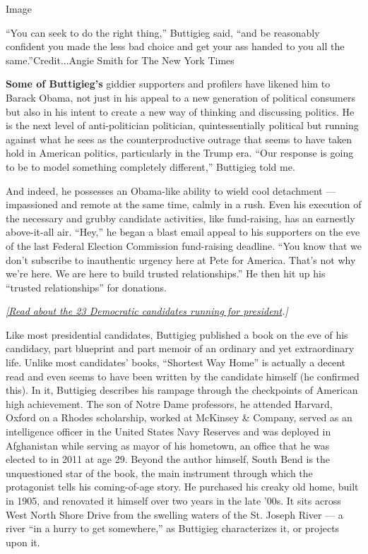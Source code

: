 Image

``You can seek to do the right thing,'' Buttigieg said, ``and be
reasonably confident you made the less bad choice and get your ass
handed to you all the same.''Credit...Angie Smith for The New York Times

\textbf{Some of Buttigieg's} giddier supporters and profilers have
likened him to Barack Obama, not just in his appeal to a new generation
of political consumers but also in his intent to create a new way of
thinking and discussing politics. He is the next level of
anti-politician politician, quintessentially political but running
against what he sees as the counterproductive outrage that seems to have
taken hold in American politics, particularly in the Trump era. ``Our
response is going to be to model something completely different,''
Buttigieg told me.

And indeed, he possesses an Obama-like ability to wield cool detachment
--- impassioned and remote at the same time, calmly in a rush. Even his
execution of the necessary and grubby candidate activities, like
fund-raising, has an earnestly above-it-all air. ``Hey,'' he began a
blast email appeal to his supporters on the eve of the last Federal
Election Commission fund-raising deadline. ``You know that we don't
subscribe to inauthentic urgency here at Pete for America. That's not
why we're here. We are here to build trusted relationships.'' He then
hit up his ``trusted relationships'' for donations.

\href{https://www.nytimes3xbfgragh.onion/2019/06/12/magazine/democratic-primary-candidates-iowa-caucus.html}{\emph{{[}Read
about the 23 Democratic candidates running for president}}\emph{.{]}}

Like most presidential candidates, Buttigieg published a book on the eve
of his candidacy, part blueprint and part memoir of an ordinary and yet
extraordinary life. Unlike most candidates' books, ``Shortest Way Home''
is actually a decent read and even seems to have been written by the
candidate himself (he confirmed this). In it, Buttigieg describes his
rampage through the checkpoints of American high achievement. The son of
Notre Dame professors, he attended Harvard, Oxford on a Rhodes
scholarship, worked at McKinsey \& Company, served as an intelligence
officer in the United States Navy Reserves and was deployed in
Afghanistan while serving as mayor of his hometown, an office that he
was elected to in 2011 at age 29. Beyond the author himself, South Bend
is the unquestioned star of the book, the main instrument through which
the protagonist tells his coming-of-age story. He purchased his creaky
old home, built in 1905, and renovated it himself over two years in the
late '00s. It sits across West North Shore Drive from the swelling
waters of the St. Joseph River --- a river ``in a hurry to get
somewhere,'' as Buttigieg characterizes it, or projects upon it.


